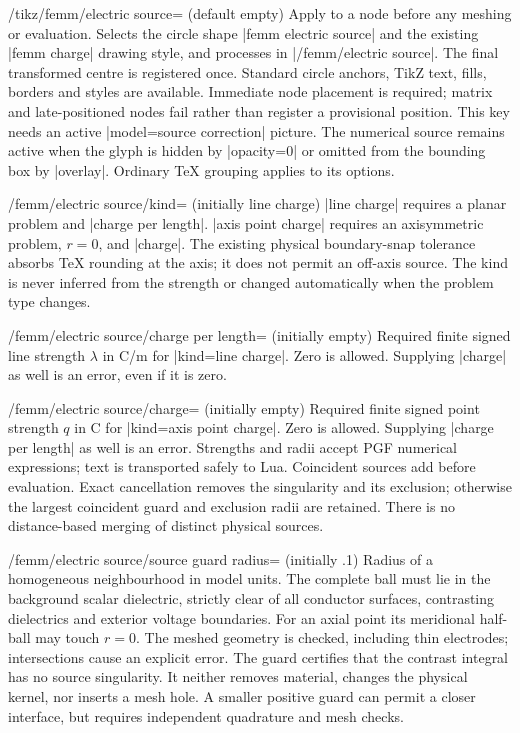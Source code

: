 \begin{key}{/tikz/femm/electric source= (default \normalfont empty)}
Apply to a node before any meshing or evaluation. Selects the circle shape
|femm electric source| and the existing |femm charge| drawing style, and processes
 in |/femm/electric source|. The final transformed centre is
registered once. Standard circle anchors, TikZ text, fills, borders and styles
are available. Immediate node placement is required; matrix and late-positioned
nodes fail rather than register a provisional position. This key needs an
active |model=source correction| picture. The numerical source remains active
when the glyph is hidden by |opacity=0| or omitted from the bounding box by
|overlay|. Ordinary TeX grouping applies to its options.
\end{key}
\begin{key}{/femm/electric source/kind= (initially line charge)}
|line charge| requires a planar problem and |charge per length|.
|axis point charge| requires an axisymmetric problem, $r=0$, and |charge|.
The existing physical boundary-snap tolerance absorbs TeX rounding at the axis;
it does not permit an off-axis source. The kind is never inferred from the
strength or changed automatically when the problem type changes.
\end{key}
\begin{key}{/femm/electric source/charge per length= (initially \normalfont empty)}
Required finite signed line strength $\lambda$ in C/m for |kind=line charge|.
Zero is allowed. Supplying |charge| as well is an error, even if it is zero.
\end{key}
\begin{key}{/femm/electric source/charge= (initially \normalfont empty)}
Required finite signed point strength $q$ in C for |kind=axis point charge|.
Zero is allowed. Supplying |charge per length| as well is an error. Strengths
and radii accept PGF numerical expressions; text is transported safely to Lua.
Coincident sources add before evaluation. Exact cancellation removes the
singularity and its exclusion; otherwise the largest coincident guard and
exclusion radii are retained. There is no distance-based merging of distinct
physical sources.
\end{key}
\begin{key}{/femm/electric source/source guard radius= (initially .1)}
Radius of a homogeneous neighbourhood in model units. The complete ball must
lie in the background scalar dielectric, strictly clear of all conductor
surfaces, contrasting dielectrics and exterior voltage boundaries. For an
axial point its meridional half-ball may touch $r=0$. The meshed geometry is
checked, including thin electrodes; intersections cause an explicit error.
The guard certifies that the contrast integral has no source singularity.
It neither removes material, changes the physical kernel, nor inserts a mesh
hole. A smaller positive guard can permit a closer interface, but requires
independent quadrature and mesh checks.
\end{key}
